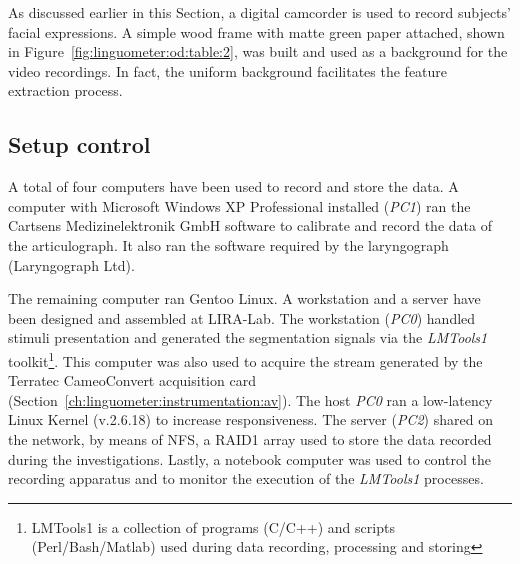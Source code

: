 As discussed earlier in this Section, a digital camcorder is used to record
subjects' facial expressions. A simple wood frame with matte green
paper attached, shown in Figure~\ref{fig:linguometer:od:table:2}, was built and
used as a background for the video recordings.
In fact, the uniform background facilitates the feature extraction process.
\subsection{Setup control}
\label{ch:linguometer:instrumentation:setup}
A total of four computers have been used to record and store the data.
A computer with Microsoft Windows XP Professional installed (\emph{PC1})
ran the Cartsens Medizinelektronik GmbH software to calibrate and record 
the data of the articulograph.
It also ran the software required by the laryngograph
(Laryngograph Ltd).

The remaining computer ran Gentoo Linux. 
A workstation and a server have been designed and assembled at LIRA-Lab. 
The workstation (\emph{PC0}) handled stimuli presentation and generated the
segmentation signals via the \emph{LMTools1} 
toolkit\footnote{LMTools1 is a collection of programs (C/C++)
and scripts (Perl/Bash/Matlab) used during data recording,
processing and storing}. This computer was also used to acquire the stream
generated by the Terratec CameoConvert acquisition card
(Section~\ref{ch:linguometer:instrumentation:av}).
The host \emph{PC0} ran a low-latency Linux 
Kernel (v.2.6.18) to increase responsiveness.
The server (\emph{PC2}) shared on the network, by means of NFS,
a RAID1 array used to store the data recorded during the investigations.
Lastly, a notebook computer was used to control the recording
apparatus and to monitor the execution of the \emph{LMTools1} processes.

